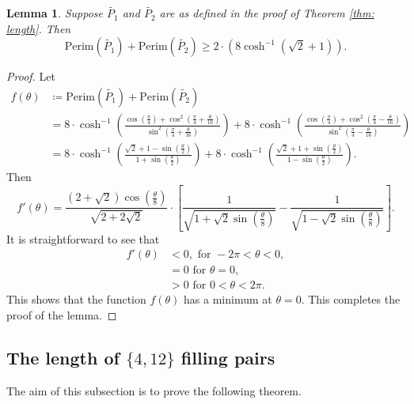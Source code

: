 \documentclass[11pt,reqno]{amsart}
\theoremstyle{plain}
\newtheorem{lemma}[theorem]{Lemma}
\theoremstyle{definition}
\theoremstyle{remark}
\numberwithin{equation}{section}
\numberwithin{figure}{section}
\begin{document}
\begin{lemma}\label{lem 1.2}
    Suppose $\tilde{P_1}$ and $\tilde{P_2}$ are as defined in the proof of Theorem \ref{thm: length}. Then 
    $$\mathrm{Perim}(\tilde{P_1})+\mathrm{Perim}(\tilde{P_2}) \geq 2\cdot (8\cosh^{-1}(\sqrt{2}+1)).$$
\end{lemma}
\begin{proof}
    Let
    \begin{align*}
        f(\theta)& \coloneqq \mathrm{Perim}(\tilde{P_1})+\mathrm{Perim}(\tilde{P_2})\\
    &=8 \cdot \cosh^{-1}\left(\frac{\cos\left(\frac{\pi}{4}\right)+\cos^2\left(\frac{\pi}{4}+\frac{\theta}{16}\right)}{\sin^2\left(\frac{\pi}{4}+\frac{\theta}{16}\right)}\right) + 8\cdot \cosh^{-1}\left(\frac{\cos\left(\frac{\pi}{4}\right)+\cos^2\left(\frac{\pi}{4}-\frac{\theta}{16}\right)}{\sin^2\left(\frac{\pi}{4}-\frac{\theta}{16}\right)}\right)\\
    &=8 \cdot \cosh^{-1} \left ({\frac{\sqrt{2}+1-\sin{\left (\frac{\theta}{2}\right)}}{1+\sin{\left (\frac{\theta}{2}\right)}}} \right ) + 8 \cdot \cosh^{-1}\left ({\frac{\sqrt{2}+1 + \sin{\left (\frac{\theta}{2}\right)}}{1 - \sin{\left (\frac{\theta}{2}\right)}}}\right).
    \end{align*}
    Then 
    $$f'(\theta) = \frac{(2 + \sqrt{2}) \cos{\left (\frac{\theta}{8}\right )}}{ \sqrt{2+2 \sqrt{2}
    }} \cdot \left[ \frac{1}{\sqrt{1+\sqrt{2} \sin {\left (\frac{\theta}{8}\right )}}} - \frac{1}{\sqrt{1 - \sqrt{2} \sin {\left (\frac{\theta}{8}\right )}}} \right].$$
    It is straightforward to see that
    \begin{align*}
        f'(\theta)&<0, \text{ for } -2\pi<\theta<0,\\
        &=0 \text{ for } \theta =0,\\
        &>0 \text{ for } 0<\theta <2 \pi.
    \end{align*}
    This shows that the function $f(\theta)$ has a minimum at $\theta =0$. This completes the proof of the lemma.
\end{proof}


\subsection{The length of \texorpdfstring{$\{4,12\}$}{} filling pairs}\label{sub 4.1}
The aim of this subsection is to prove the following theorem.
\end{document}
